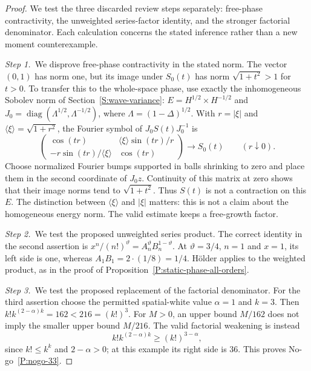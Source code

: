 \begin{proof}
  We test the three discarded review steps separately: free-phase
  contractivity, the unweighted series-factor identity, and the stronger
  factorial denominator. Each calculation concerns the stated inference rather
  than a new moment counterexample.


  \medskip
  \noindent\textit{Step 1.~}We disprove free-phase contractivity in the stated
  norm.
  The vector $(0,1)$ has norm one, but its image under $S_0(t)$ has norm
  $\sqrt{1+t^2}>1$ for $t>0$. To transfer this to the whole-space phase,
  use exactly the inhomogeneous Sobolev norm of
  Section~\ref{S:wave-variance}: $E=H^{1/2}\times H^{-1/2}$ and
  $J_0=\operatorname{diag}(\Lambda^{1/2},\Lambda^{-1/2})$, where
  $\Lambda=(1-\Delta)^{1/2}$. With $r=|\xi|$ and
  $\langle\xi\rangle=\sqrt{1+r^2}$, the Fourier symbol of
  $J_0S(t)J_0^{-1}$ is
  \[
    \begin{pmatrix}
      \cos(tr)&\langle\xi\rangle\sin(tr)/r\\
      -r\sin(tr)/\langle\xi\rangle&\cos(tr)
    \end{pmatrix}
    \longrightarrow S_0(t)\qquad(r\downarrow0).
  \]
  Choose normalized Fourier bumps supported in balls shrinking to zero
  and place them in the second coordinate of $J_0z$. Continuity of this
  matrix at zero shows that their image norms tend to $\sqrt{1+t^2}$.
  Thus $S(t)$ is not a contraction on this $E$. The distinction between
  $\langle\xi\rangle$ and $|\xi|$ matters: this is not a claim about the
  homogeneous energy norm. The valid estimate keeps a free-growth factor.


  \medskip
  \noindent\textit{Step 2.~}We test the proposed unweighted series product.
  The correct identity in the second assertion is
  $x^n/(n!)^\vartheta=A_n^\vartheta B_n^{1-\vartheta}$.
  At $\vartheta=3/4$, $n=1$ and $x=1$, its left side is one, whereas
  $A_1B_1=2\cdot(1/8)=1/4$. H\"older applies to the weighted product, as
  in the proof of Proposition~\ref{P:static-phase-all-orders}.


  \medskip
  \noindent\textit{Step 3.~}We test the proposed replacement of the factorial
  denominator.
  For the third assertion choose the permitted spatial-white value
  $\alpha=1$ and $k=3$. Then $k!k^{(2-\alpha)k}=162<216=(k!)^3$.
  For $M>0$, an upper bound $M/162$ does not imply the smaller upper bound
  $M/216$.
  The valid factorial weakening is instead
  \[
    k!k^{(2-\alpha)k}\ge(k!)^{3-\alpha},
  \]
  since $k!\le k^k$ and $2-\alpha>0$; at this example its right side is
  $36$. This proves No-go~\ref{P:nogo-33}.
\end{proof}

